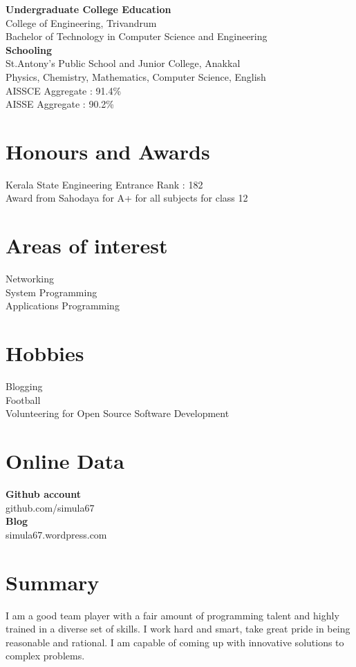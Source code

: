 \documentclass[line,margin]{res}
\begin{document}
\begin{resume}
{\bf Undergraduate College Education}\\
College of Engineering, Trivandrum\\
Bachelor of Technology in Computer Science and Engineering\\

{\bf Schooling} \\
St.Antony's Public School and Junior College, Anakkal\\
Physics, Chemistry, Mathematics, Computer Science, English\\

AISSCE Aggregate : 91.4\%\\
AISSE Aggregate : 90.2\%\\

\section{Honours and Awards}
Kerala State Engineering Entrance Rank : 182\\
Award from Sahodaya for A+ for all subjects for class 12\\

\section{Areas of interest}
Networking\\
System Programming\\
Applications Programming\\

\section{Hobbies}
Blogging\\
Football\\
Volunteering for Open Source Software Development\\

\section{Online Data}
{\bf Github account}\\
github.com/simula67\\
{\bf Blog}\\
simula67.wordpress.com

\section{Summary}
I am a good team player with a fair amount of programming talent and highly trained in a diverse set of skills. I work hard and smart, take great pride in being reasonable and rational. I am capable of coming up with innovative solutions to complex problems.

\end{resume}
\end{document}
